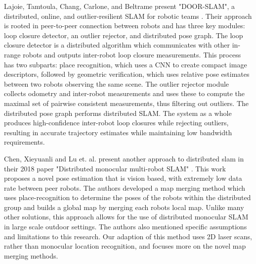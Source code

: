 \documentclass[11pt, conference]{IEEEtran}
\begin{document}
Lajoie, Tamtoula, Chang, Carlone, and Beltrame present "DOOR-SLAM", a distributed, online, and outlier-resilient SLAM for robotic teams \cite{Lajoie2020DOORSLAM}. Their approach is rooted in peer-to-peer connection between robots and has three key modules: loop closure detector, an outlier rejector, and distributed pose graph. The loop closure detector is a distributed algorithm which communicates with other in-range robots and outputs inter-robot loop closure measurements. This process has two subparts: place recognition, which uses a CNN to create compact image descriptors, followed by geometric verification, which uses relative pose estimates between two robots observing the same scene.  The outlier rejector module collects odometry and inter-robot measurements and uses these to compute the maximal set of pairwise consistent measurements, thus filtering out outliers. The distributed pose graph performs distributed SLAM. The system as a whole produces high-confidence inter-robot loop closures while rejecting outliers, resulting in accurate trajectory estimates while maintaining low bandwidth requirements.

Chen, Xieyuanli and Lu et. al. present another approach to distributed slam in their 2018 paper "Distributed monocular multi-robot SLAM" \cite{monocular}. This work proposes a novel pose estimation that is vision based, with extremely low data rate between peer robots. The authors developed a map merging method which uses place-recognition to determine the poses of the robots within the distributed group and builds a global map by merging each robots local map. Unlike many other solutions, this approach allows for the use of distributed monocular SLAM in large scale outdoor settings. The authors also mentioned specific assumptions and limitations to this research. Our adaption of this method uses 2D laser scans, rather than monocular location recognition, and focuses more on the novel map merging methods.
\end{document}
